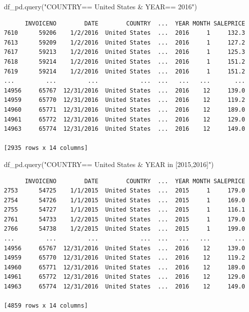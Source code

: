 \documentclass[
  letterpaper,
  DIV=11,
  numbers=noendperiod]{scrreprt}
\newenvironment{Shaded}{\begin{snugshade}}{\end{snugshade}}
\newcommand{\NormalTok}[1]{\textcolor[rgb]{0.00,0.23,0.31}{#1}}
\newcommand{\StringTok}[1]{\textcolor[rgb]{0.13,0.47,0.30}{#1}}
\begin{document}
\begin{Shaded}
\begin{Highlighting}[]
\NormalTok{df\_pd.query(}\StringTok{"COUNTRY== \textquotesingle{}United States\textquotesingle{} \& YEAR== 2016"}\NormalTok{)}
\end{Highlighting}
\end{Shaded}

\begin{verbatim}
      INVOICENO        DATE        COUNTRY  ...  YEAR MONTH SALEPRICE
7610      59206    1/2/2016  United States  ...  2016     1     132.3
7613      59209    1/2/2016  United States  ...  2016     1     127.2
7617      59213    1/2/2016  United States  ...  2016     1     125.3
7618      59214    1/2/2016  United States  ...  2016     1     151.2
7619      59214    1/2/2016  United States  ...  2016     1     151.2
...         ...         ...            ...  ...   ...   ...       ...
14956     65767  12/31/2016  United States  ...  2016    12     139.0
14959     65770  12/31/2016  United States  ...  2016    12     119.2
14960     65771  12/31/2016  United States  ...  2016    12     189.0
14961     65772  12/31/2016  United States  ...  2016    12     129.0
14963     65774  12/31/2016  United States  ...  2016    12     149.0

[2935 rows x 14 columns]
\end{verbatim}

\begin{Shaded}
\begin{Highlighting}[]
\NormalTok{df\_pd.query(}\StringTok{"COUNTRY== \textquotesingle{}United States\textquotesingle{} \& YEAR in [2015,2016]"}\NormalTok{)}
\end{Highlighting}
\end{Shaded}

\begin{verbatim}
      INVOICENO        DATE        COUNTRY  ...  YEAR MONTH SALEPRICE
2753      54725    1/1/2015  United States  ...  2015     1     179.0
2754      54726    1/1/2015  United States  ...  2015     1     169.0
2755      54727    1/1/2015  United States  ...  2015     1     116.1
2761      54733    1/2/2015  United States  ...  2015     1     179.0
2766      54738    1/2/2015  United States  ...  2015     1     199.0
...         ...         ...            ...  ...   ...   ...       ...
14956     65767  12/31/2016  United States  ...  2016    12     139.0
14959     65770  12/31/2016  United States  ...  2016    12     119.2
14960     65771  12/31/2016  United States  ...  2016    12     189.0
14961     65772  12/31/2016  United States  ...  2016    12     129.0
14963     65774  12/31/2016  United States  ...  2016    12     149.0

[4859 rows x 14 columns]
\end{verbatim}
\end{document}
